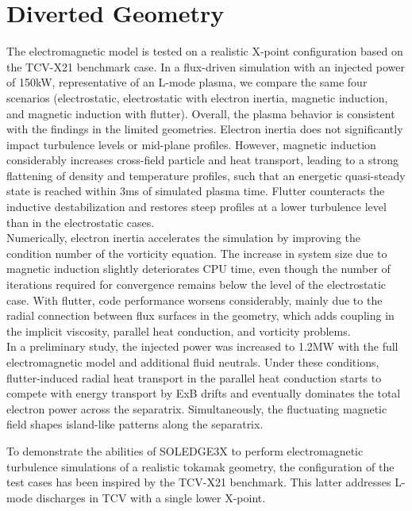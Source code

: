 \chapter{Diverted Geometry}
\label{chap:TCV}

\begin{chaptersummarybox}
	The electromagnetic model is tested on a realistic X-point configuration based on the TCV-X21 benchmark case. In a flux-driven simulation with an injected power of 150kW, representative of an L-mode plasma, we compare the same four scenarios (electrostatic, electrostatic with electron inertia, magnetic induction, and magnetic induction with flutter). Overall, the plasma behavior is consistent with the findings in the limited geometries. Electron inertia does not significantly impact turbulence levels or mid-plane profiles. However, magnetic induction considerably increases cross-field particle and heat transport, leading to a strong flattening of density and temperature profiles, such that an energetic quasi-steady state is reached within 3ms of simulated plasma time. Flutter counteracts the inductive destabilization and restores steep profiles at a lower turbulence level than in the electrostatic cases. \\
	Numerically, electron inertia accelerates the simulation by improving the condition number of the vorticity equation. The increase in system size due to magnetic induction slightly deteriorates CPU time, even though the number of iterations required for convergence remains below the level of the electrostatic case. With flutter, code performance worsens considerably, mainly due to the radial connection between flux surfaces in the geometry, which adds coupling in the implicit viscosity, parallel heat conduction, and vorticity problems. \\
	In a preliminary study, the injected power was increased to 1.2MW with the full electromagnetic model and additional fluid neutrals. Under these conditions, flutter-induced radial heat transport in the parallel heat conduction starts to compete with energy transport by ExB drifts and eventually dominates the total electron power across the separatrix. Simultaneously, the fluctuating magnetic field shapes island-like patterns along the separatrix.
\end{chaptersummarybox}

\newpage


To demonstrate the abilities of SOLEDGE3X to perform electromagnetic turbulence simulations of a realistic tokamak geometry, the configuration of the test cases has been inspired by the TCV-X21 benchmark\cite{oliveira2022}. This latter addresses L-mode discharges in TCV with a single lower X-point. 


